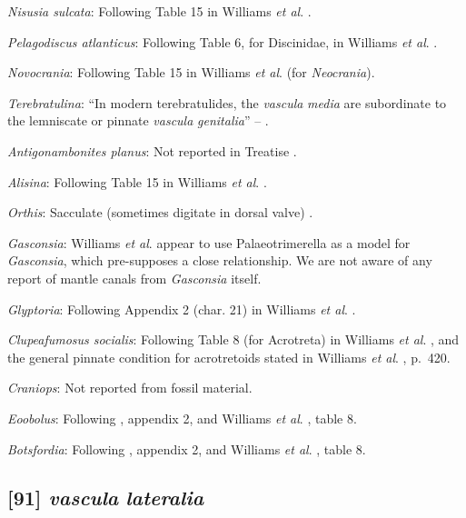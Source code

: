 \documentclass[]{book}
\theoremstyle{definition}
\theoremstyle{definition}
\theoremstyle{definition}
\theoremstyle{remark}
\begin{document}
\emph{Nisusia sulcata}: Following Table 15 in Williams \emph{et al}.
\citeyearpar{Williams2000BrachiopodaLinguliformea}.

\emph{Pelagodiscus atlanticus}: Following Table 6, for Discinidae, in
Williams \emph{et al}.
\citeyearpar{Williams2000BrachiopodaLinguliformea}.

\emph{Novocrania}: Following Table 15 in Williams \emph{et al}.
\citeyearpar{Williams2000BrachiopodaLinguliformea} (for
\emph{Neocrania}).

\emph{Terebratulina}: ``In modern terebratulides, the \emph{vascula}
\emph{media} are subordinate to the lemniscate or pinnate \emph{vascula}
\emph{genitalia}'' -- \citet{Williams1997BrachiopodaRevised}.

\emph{Antigonambonites planus}: Not reported in Treatise
\citep{Williams2000BrachiopodaLinguliformea}.

\emph{Alisina}: Following Table 15 in Williams \emph{et al}.
\citeyearpar{Williams2000BrachiopodaLinguliformea}.

\emph{Orthis}: Sacculate (sometimes digitate in dorsal valve)
\citep[p716]{Williams2000BrachiopodaLinguliformea}.

\emph{Gasconsia}: Williams \emph{et al}. \citeyearpar[table
15]{Williams2000BrachiopodaLinguliformea} appear to use Palaeotrimerella
\citep[as drawn in][]{Williams1997BrachiopodaRevised} as a model for
\emph{Gasconsia}, which pre-supposes a close relationship. We are not
aware of any report of mantle canals from \emph{Gasconsia} itself.

\emph{Glyptoria}: Following Appendix 2 (char. 21) in Williams \emph{et
al}. \citeyearpar{Williams1998Thediversity}.

\emph{Clupeafumosus socialis}: Following Table 8 (for Acrotreta) in
Williams \emph{et al}.
\citeyearpar{Williams2000BrachiopodaLinguliformea}, and the general
pinnate condition for acrotretoids stated in Williams \emph{et al}.
\citeyearpar{Williams1997BrachiopodaRevised}, p.~420.

\emph{Craniops}: Not reported from fossil material.

\emph{Eoobolus}: Following \citet{Williams1998Thediversity}, appendix 2,
and Williams \emph{et al}.
\citeyearpar{Williams2000BrachiopodaLinguliformea}, table 8.

\emph{Botsfordia}: Following \citet{Williams1998Thediversity}, appendix
2, and Williams \emph{et al}.
\citeyearpar{Williams2000BrachiopodaLinguliformea}, table 8.

\hypertarget{vascula-lateralia}{%
\subsection*{\texorpdfstring{{[}91{]} \emph{vascula}
\emph{lateralia}}{{[}91{]} vascula lateralia}}\label{vascula-lateralia}}
\end{document}
